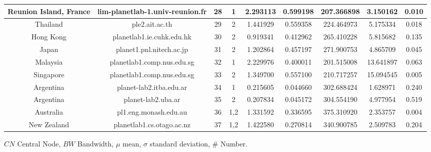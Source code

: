\begin{table*} [tb]
\begin{tabular}{|c|c|c|c|c|c|c|c|c|}
        Reunion Island, France & lim-planetlab-1.univ-reunion.fr & 28 & 1  &2.293113&0.599198&207.366898&3.150162&0.010\\\hline
        Thailand & ple2.ait.ac.th                       & 29  &  2 &1.441929&0.559358&224.464973&5.175334&0.018\\\hline
        Hong Kong & planetlab1.ie.cuhk.edu.hk           & 30  &  2 &0.919341&0.412962&265.410228&5.815682&0.135\\\hline
        Japan & planet1.pnl.nitech.ac.jp                & 31  &  2 &1.202864&0.457197&271.900753&4.865709&0.045\\\hline
        Malaysia & planetlab1.comp.nus.edu.sg           & 32  &  1 &2.229976&0.400011&201.515008&13.641897&0.063\\\hline
        Singapore & planetlab1.comp.nus.edu.sg          & 33  &  2 &1.349700&0.557100&210.717257&15.094545&0.005\\\hline
        Argentina & planet-lab2.itba.edu.ar             & 34  &  1 &0.215605&0.044660&302.688424&1.628971&0.240\\\hline
        Argentina  & planet-lab2.uba.ar                 & 35  &  2 &0.207834&0.045172&304.554190&4.977954&0.519\\\hline
        Australia & pl1.eng.monash.edu.au               & 36  &1,2 &1.331592&0.336595&375.310920&2.353757&0.004\\\hline
        New Zealand & planetlab1.cs.otago.ac.nz         & 37  &1,2 &1.422580&0.270814&340.900785&2.509783&0.204\\\hline
\end{tabular}
\begin{flushleft}
\hspace{1cm}$CN$ Central Node, $BW$ Bandwidth, $\mu$ mean, $\sigma$ standard deviation, $\#$ Number.
\end{flushleft}
\end{table*}
